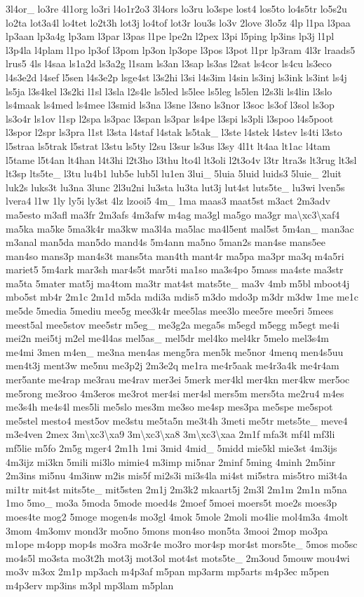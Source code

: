 {3l4or\-\_\- lo3re 4l1org lo3ri l4o1r2o3 3l4ors lo3ru lo3spe lost4 los5to lo4s5tr lo5s2u lo2ta lot3a4l lo4tet lo2t3h lot3j lo4tof lot3r lou3s lo3v 2love 3lo5z 4lp l1pa l3paa lp3aan lp3a4g lp3am l3par l3pas l1pe lpe2n l2pex l3pi l5ping lp3ins lp3j l1pl l3p4la l4plam l1po lp3of l3pom lp3on lp3ope l3pos l3pot l1pr lp3ram 4l3r lraads5 lrus5 4ls l4saa ls1a2d ls3a2g l1sam ls3an l3sap ls3as l2sat ls4cor ls4cu ls3eco l4s3e2d l4sef l5sen l4s3e2p lsge4st l3s2hi l3si l4s3im l4sin ls3inj ls3ink ls3int ls4j ls5ja l3s4kel l3s2ki l1sl l3sla l2s4le ls5led ls5lee ls5leg ls5len l2s3li ls4lin l3slo ls4maak ls4med ls4mee l3smid ls3na l3sne l3sno ls3nor l3soc ls3of l3sol ls3op ls3o4r ls1ov l1sp l2spa ls3pac l3span ls3par ls4pe l3spi ls3pli l3spoo l4s5poot l3spor l2spr ls3pra l1st l3sta l4staf l4stak ls5tak\-\_\- l3ste l4stek l4stev ls4ti l3sto l5straa ls5trak l5strat l3stu ls5ty l2su l3sur ls3us l3sy 4l1t lt4aa lt1ac l4tam l5tame l5t4an lt4han l4t3hi l2t3ho l3thu lto4l lt3oli l2t3o4v l3tr ltra3s lt3rug lt3sl lt3sp lts5te\-\_\- l3tu lu4b1 lub5e lub5l lu1en 3lui\-\_\- 5luia 5luid luids3 5luie\-\_\- 2luit luk2s luks3t lu3na 3lunc 2l3u2ni lu3sta lu3ta lut3j lut4st luts5te\-\_\- lu3wi lven5s lvera4 l1w 1ly ly5i ly3st 4lz lzooi5 4m\-\_\- 1ma maas3 maat5st m3act 2m3adv ma5esto m3afl ma3fr 2m3afs 4m3afw m4ag ma3gl ma5go ma3gr ma\textbackslash{}xc3\textbackslash{}xaf4 ma5ka ma5ke 5ma3k4r ma3kw ma3l4a ma5lac ma4l5ent mal5st 5m4an\-\_\- man3ac m3anal man5da man5do mand4s 5m4ann ma5no 5man2s man4se mans5ee man4so mans3p man4s3t mans5ta man4th mant4r ma5pa ma3pr ma3q m4a5ri mariet5 5m4ark mar3sh mar4s5t mar5ti ma1so ma3s4po 5mass ma4ste ma3str ma5ta 5mater mat5j ma4tom ma3tr mat4st mats5te\-\_\- ma3v 4mb m5bl mboot4j mbo5st mb4r 2m1c 2m1d m5da mdi3a mdis5 m3do mdo3p m3dr m3dw 1me me1c me5de 5media 5mediu mee5g mee3k4r mee5las mee3lo mee5re mee5ri 5mees meest5al mee5stov mee5str m5eg\-\_\- me3g2a mega5s m5egd m5egg m5egt me4i mei2n mei5tj m2el me4l4as mel5as\-\_\- mel5dr mel4ko mel4kr 5melo mel3s4m me4mi 3men m4en\-\_\- me3na men4as meng5ra men5k me5nor 4menq men4s5uu men4t3j ment3w me5nu me3p2j 2m3e2q me1ra me4r5aak me4r3a4k me4r4am mer5ante me4rap me3rau me4rav mer3ei 5merk mer4kl mer4kn mer4kw mer5oc me5rong me3roo 4m3eros me3rot mer4si mer4sl mers5m mers5ta me2ru4 m4es me3s4h me4s4l mes5li me5slo mes3m me3so me4sp mes3pa me5spe me5spot me5stel mesto4 mest5ov me3stu me5ta5n me3t4h 3meti me5tr mets5te\-\_\- meve4 m3e4ven 2mex 3m\textbackslash{}xc3\textbackslash{}xa9 3m\textbackslash{}xc3\textbackslash{}xa8 3m\textbackslash{}xc3\textbackslash{}xaa 2m1f mfa3t mf4l mf3li mf5lie m5fo 2m5g mger4 2m1h 1mi 3mid 4mid\-\_\- 5midd mie5kl mie3st 4m3ijs 4m3ijz mi3kn 5mili mi3lo mimie4 m3imp mi5nar 2minf 5ming 4minh 2m5inr 2m3ins mi5nu 4m3inw m2is mis5f mi2s3i mi3s4la mi4st mi5stra mis5tro mi3t4a mi1tr mit4st mits5te\-\_\- mit5sten 2m1j 2m3k2 mkaart5j 2m3l 2m1m 2m1n m5na 1mo 5mo\-\_\- mo3a 5moda 5mode moed4s 2moef 5moei moers5t moe2s moes3p moes4te mog2 5moge mogen4s mo3gl 4mok 5mole 2moli mo4lie mol4m3a 4molt 3mom 4m3omv mond3r mo5no 5mons mon4so mon5ta 3mooi 2mop mo3pa m1ope m4opp mop4s mo3ra mo3r4e mo3ro mor4sp mor4st mors5te\-\_\- 5mos mo5sc mo4s5l mo3sta mo3t2h mot3j mot3ol mot4st mots5te\-\_\- 2m3oud 5mouw mou4wi mo3v m3ox 2m1p mp3ach m4p3af m5pan mp3arm mp5arts m4p3ec m5pen m4p3erv mp3ins m3pl mp3lam m5plan }
